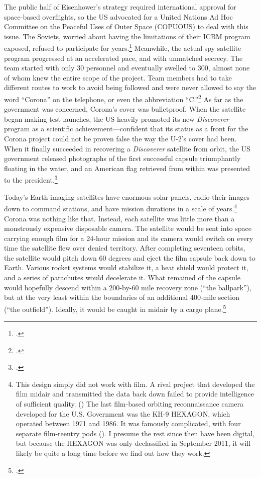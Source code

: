 \documentclass[14pt]{extarticle}
\begin{document}
The public half of Eisenhower's strategy required international approval for space-based overflights, so the US advocated for a United Nations Ad Hoc Committee on the Peaceful Uses of Outer Space (COPUOUS) to deal with this issue. The Soviets, worried about having the limitations of their ICBM program exposed, refused to participate for years.\footcite[p.~140]{day_eye_2015} Meanwhile, the actual spy satellite program progressed at an accelerated pace, and with unmatched secrecy. The team started with only 30 personnel and eventually swelled to 300, almost none of whom knew the entire scope of the project. Team members had to take different routes to work to avoid being followed and were never allowed to say the word ``Corona'' on the telephone, or even the abbreviation ``C.''\footcite[p.~51]{peebles_shadow_2000} As far as the government was concerned, Corona's cover was bulletproof. When the satellite began making test launches, the US heavily promoted its new \emph{Discoverer} program as a scientific achievement---confident that its status as a front for the Corona project could not be proven false the way the U-2's cover had been. When it finally succeeded in recovering a \emph{Discoverer} satellite from orbit, the US government released photographs of the first successful capsule triumphantly floating in the water, and an American flag retrieved from within was presented to the president.\footcite[p.~83]{peebles_shadow_2000}

Today's Earth-imaging satellites have enormous solar panels, radio their images down to command stations, and have mission durations in a scale of years.\footnote{This design simply did not work with film. A rival project that developed the film midair and transmitted the data back down failed to provide intelligence of sufficient quality. (\cite[p.~203-204]{brugioni_eyes_2010}) The last film-based orbiting reconnaissance camera developed for the U.S. Government was the KH-9 HEXAGON, which operated between 1971 and 1986. It was famously complicated, with four separate film-reentry pods (\cite{pressel_spy_2013}). I presume the rest since then have been digital, but because the HEXAGON was only declassified in September 2011, it will likely be quite a long time before we find out how they work.} Corona was nothing like that. Instead, each satellite was little more than a monstrously expensive disposable camera. The satellite would be sent into space carrying enough film for a 24-hour mission and its camera would switch on every time the satellite flew over denied territory. After completing seventeen orbits, the satellite would pitch down 60 degrees and eject the film capsule back down to Earth. Various rocket systems would stabilize it, a heat shield would protect it, and a series of parachutes would decelerate it. What remained of the capsule would hopefully descend within a 200-by-60 mile recovery zone (``the ballpark''), but at the very least within the boundaries of an additional 400-mile section (``the outfield''). Ideally, it would be caught in midair by a cargo plane.\footcite[p.~56]{peebles_corona_1997}
\end{document}

